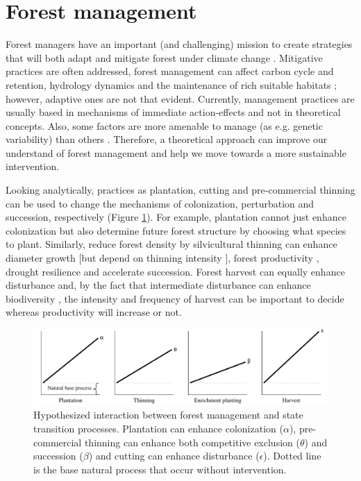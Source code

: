 \section{Forest management}

Forest managers have an important (and challenging) mission to create strategies that will both adapt and mitigate forest under climate change \parencite{Millar2007}.
Mitigative practices are often addressed, forest management can affect carbon cycle and retention, hydrology dynamics and the maintenance of rich suitable habitats \parencite{Becknell2015}; however, adaptive ones are not that evident.
Currently, management practices are usually based in mechanisms of immediate action-effects and not in theoretical concepts.
Also, some factors are more amenable to manage (as e.g. genetic variability) than others \parencite[e.g. individual sensitivity, presence of alternative stable states;][]{Oliver2015}.
Therefore, a theoretical approach can improve our understand of forest management and help we move towards a more sustainable intervention.

Looking analytically, practices as plantation, cutting and pre-commercial thinning can be used to change the mechanisms of colonization, perturbation and succession, respectively (Figure \ref{fig:fig2}).
For example, plantation cannot just enhance colonization but also determine future forest structure by choosing what species to plant.
Similarly, reduce forest density by silvicultural thinning can enhance diameter growth \parencite{Rytter2014} [but depend on thinning intensity \parencite{Olivar2014,Fuller2013}], forest productivity \parencite{Chase2016a}, drought resilience \parencite{Bottero2017,Sohn2013} and accelerate succession.
Forest harvest can equally enhance disturbance and, by the fact that intermediate disturbance can enhance biodiversity \parencite{Grime1973,Horn1975,Connell1978}, the intensity and frequency of harvest can be important to decide whereas productivity will increase or not.

\begin{figure}
    \centering
    \includegraphics[width=1\textwidth]{img/fig2.pdf}
    \caption{Hypothesized interaction between forest management and state transition processes. Plantation can enhance colonization ($\alpha$), pre-commercial thinning can enhance both competitive exclusion ($\theta$) and succession ($\beta$) and cutting can enhance disturbance ($\epsilon$). Dotted line is the base natural process that occur without intervention.}
    \label{fig:fig2}
\end{figure}

